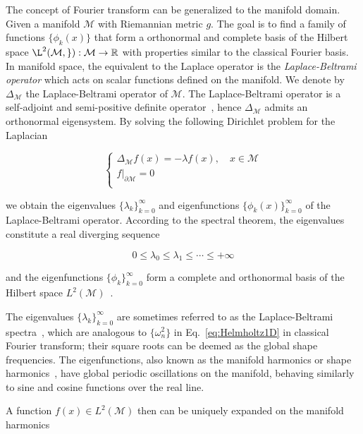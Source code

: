 The concept of Fourier transform can be generalized to the manifold domain.
Given a manifold $\mathcal{M}$ with Riemannian metric $g$. The goal is to find a
family of functions $\{\phi_k(x)\}$ that form a orthonormal and complete
basis of the Hilbert space $\L^2(\mathcal{M,g}):\mathcal{M}\to\mathbb{R}$ with
properties similar to the classical Fourier basis. In manifold space, the equivalent
to the Laplace operator is the \emph{Laplace-Beltrami operator} which acts on 
scalar functions defined on the manifold. We denote by $\Delta_\mathcal{M}$ the 
Laplace-Beltrami operator of $\mathcal{M}$. The Laplace-Beltrami operator is a self-adjoint 
and semi-positive definite operator~\cite{Rosenberg:1997}, hence $\Delta_\mathcal{M}$ admits 
an orthonormal eigensystem. By solving the following Dirichlet problem for the Laplacian

\begin{equation}
\left\{
    \begin{array}{l}
        \Delta_\mathcal{M}f(x)=-\lambda f(x),\quad x\in\mathcal{M}\\
        f|_{\partial\mathcal{M}}=0\\
    \end{array}
\right.
\end{equation}

we obtain the eigenvalues $\{\lambda_k\}_{k=0}^\infty$ and eigenfunctions $\{\phi_k(x)\}_{k=0}^\infty$ 
of the Laplace-Beltrami operator. According to the spectral theorem, the eigenvalues constitute a real 
diverging sequence

\begin{equation*}
0\leq\lambda_0\leq\lambda_1\leq\cdots\leq +\infty
\end{equation*}

and the eigenfunctions $\{\phi_k\}_{k=0}^\infty$ form a complete and orthonormal basis of the Hilbert 
space $L^2(\mathcal{M})$~\cite{Levy2006}.

The eigenvalues $\{\lambda_k\}_{k=0}^\infty$ are sometimes referred to as the Laplace-Beltrami 
spectra~\cite{Reuter:2006:CAD}, which are analogous to $\{\omega_n^2\}$ in Eq.~\ref{eq:Helmholtz1D} 
in classical Fourier transform; their square roots can be deemed as the global shape frequencies. 
The eigenfunctions, also known as the manifold harmonics or shape harmonics~\cite{Vallet2008}, 
have global periodic oscillations on the manifold, behaving similarly to sine and cosine 
functions over the real line. 

A function $f(x)\in L^2(\mathcal{M})$ then can be uniquely expanded on the manifold harmonics 

